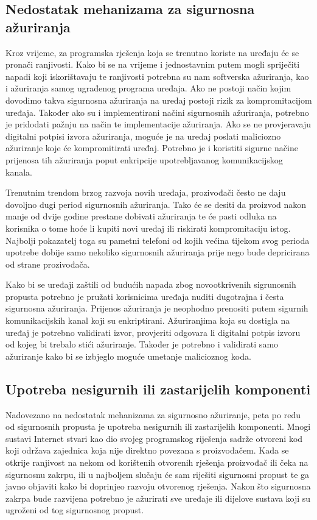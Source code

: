 \documentclass[times, utf8, diplomski]{fer}
\begin{document}
\subsection{Nedostatak mehanizama za sigurnosna ažuriranja}
Kroz vrijeme, za programska rješenja koja se trenutno koriste na uređaju će se pronači ranjivosti. Kako bi se na vrijeme i jednostavnim putem mogli spriječiti napadi koji iskorištavaju te ranjivosti potrebna su nam softverska ažuriranja, kao i ažuriranja samog ugrađenog programa  uređaja. Ako ne postoji način kojim dovodimo takva sigurnosna ažuriranja na uređaj postoji rizik za kompromitacijom uređaja. Također ako su i implementirani načini sigurnosnih ažuriranja, potrebno je pridodati pažnju na način te implementacije ažuriranja. Ako se ne provjeravaju digitalni potpisi izvora ažuriranja, moguće je na uređaj poslati maliciozno ažuriranje koje će kompromitirati uređaj. Potrebno je i koristiti sigurne načine prijenosa tih ažuriranja poput enkripcije upotrebljavanog komunikacijskog kanala. 

Trenutnim trendom brzog razvoja novih uređaja, prozivođači često ne daju dovoljno dugi period sigurnosnih ažuriranja. Tako će se desiti da proizvod nakon manje od dvije godine prestane dobivati ažuriranja te će pasti odluka na korisnika o tome hoće li kupiti novi uređaj ili riskirati kompromitaciju istog. Najbolji pokazatelj toga su pametni telefoni od kojih većina tijekom svog perioda upotrebe dobije samo nekoliko sigurnosnih ažuriranja prije nego bude depricirana od strane prozivođača.

Kako bi se uređaji zaštili od budućih napada zbog novootkrivenih sigrunosnih propusta potrebno je pružati korisnicima uređaja nuditi dugotrajna i česta sigurnosna ažuriranja. Prijenos ažuriranja je neophodno prenositi putem sigurnih komunikacijskih kanal koji su enkriptirani. Ažuriranjima koja su dostigla na uređaj je potrebno validirati izvor, provjeriti odgovara li digitalni potpis izvoru od kojeg bi trebalo stići ažuriranje. Također je potrebno i validirati samo ažuriranje kako bi se izbjeglo moguće umetanje malicioznog koda.

\subsection{Upotreba nesigurnih ili zastarijelih komponenti}
Nadovezano na nedostatak mehanizama za sigurnosno ažuriranje, peta po redu od sigurnosnih propusta je upotreba nesigurnih ili zastarijelih komponenti. Mnogi sustavi Internet stvari kao dio svojeg programskog riješenja sadrže otvoreni kod koji održava zajednica koja nije direktno povezana s proizvođačem. Kada se otkrije ranjivost na nekom od korištenih otvorenih rješenja proizvođač ili čeka na sigurnosnu zakrpu, ili u najboljem slučaju će sam riješiti sigurnosni propust te ga javno objaviti kako bi doprinjeo razvoju otvorenog rješenja. Nakon što sigurnosna zakrpa bude razvijena potrebno je ažurirati sve uređaje ili dijelove sustava koji su ugroženi od tog sigurnosnog propust. 
\end{document}
